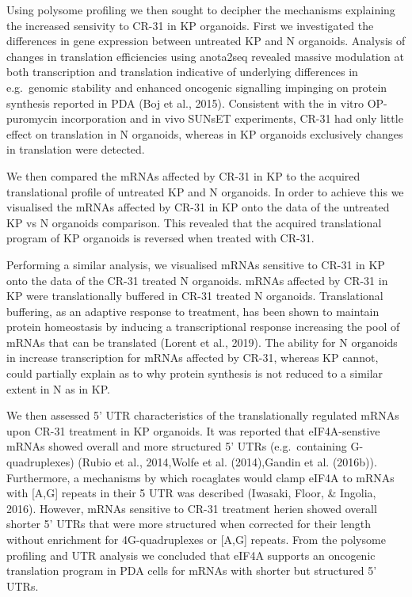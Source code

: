 \documentclass[12pt,openany]{book}
\begin{document}
Using polysome profiling we then sought to decipher the mechanisms
explaining the increased sensivity to CR-31 in KP organoids. First we
investigated the differences in gene expression between untreated KP and
N organoids. Analysis of changes in translation efficiencies using
anota2seq revealed massive modulation at both transcription and
translation indicative of underlying differences in e.g.~genomic
stability and enhanced oncogenic signalling impinging on protein
synthesis reported in PDA (Boj et al., 2015). Consistent with the in
vitro OP-puromycin incorporation and in vivo SUNsET experiments, CR-31
had only little effect on translation in N organoids, whereas in KP
organoids exclusively changes in translation were detected.

We then compared the mRNAs affected by CR-31 in KP to the acquired
translational profile of untreated KP and N organoids. In order to
achieve this we visualised the mRNAs affected by CR-31 in KP onto the
data of the untreated KP vs N organoids comparison. This revealed that
the acquired translational program of KP organoids is reversed when
treated with CR-31.

Performing a similar analysis, we visualised mRNAs sensitive to CR-31 in
KP onto the data of the CR-31 treated N organoids. mRNAs affected by
CR-31 in KP were translationally buffered in CR-31 treated N organoids.
Translational buffering, as an adaptive response to treatment, has been
shown to maintain protein homeostasis by inducing a transcriptional
response increasing the pool of mRNAs that can be translated (Lorent et
al., 2019). The ability for N organoids in increase transcription for
mRNAs affected by CR-31, whereas KP cannot, could partially explain as
to why protein synthesis is not reduced to a similar extent in N as in
KP.

We then assessed 5' UTR characteristics of the translationally regulated
mRNAs upon CR-31 treatment in KP organoids. It was reported that
eIF4A-senstive mRNAs showed overall and more structured 5' UTRs
(e.g.~containing G-quadruplexes) (Rubio et al., 2014,Wolfe et al.
(2014),Gandin et al. (2016b)). Furthermore, a mechanisms by which
rocaglates would clamp eIF4A to mRNAs with {[}A,G{]} repeats in their 5
UTR was described (Iwasaki, Floor, \& Ingolia, 2016). However, mRNAs
sensitive to CR-31 treatment herien showed overall shorter 5' UTRs that
were more structured when corrected for their length without enrichment
for 4G-quadruplexes or {[}A,G{]} repeats. From the polysome profiling
and UTR analysis we concluded that eIF4A supports an oncogenic
translation program in PDA cells for mRNAs with shorter but structured
5' UTRs.
\end{document}
